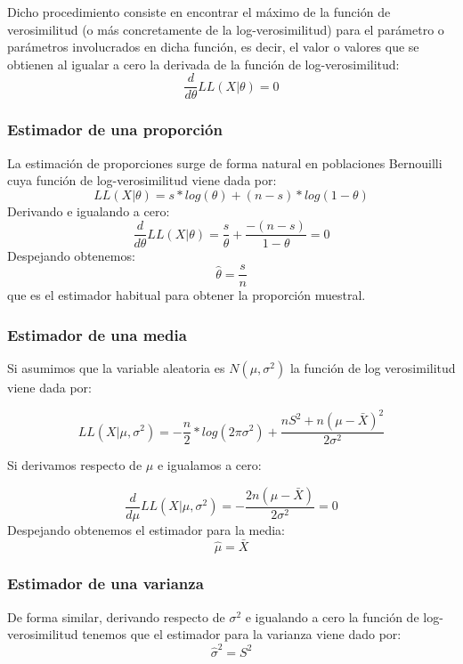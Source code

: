 \documentclass[
]{book}
\begin{document}
Dicho procedimiento consiste en encontrar el máximo de la función de verosimilitud (o más concretamente de la log-verosimilitud) para el parámetro o parámetros involucrados en dicha función, es decir, el valor o valores que se obtienen al igualar a cero la derivada de la función de log-verosimilitud: \[\frac{d}{d\theta} LL(X | \theta) = 0\]

\hypertarget{estimador-de-una-proporciuxf3n}{%
\subsubsection{Estimador de una proporción}\label{estimador-de-una-proporciuxf3n}}

La estimación de proporciones surge de forma natural en poblaciones Bernouilli cuya función de log-verosimilitud viene dada por: \[LL(X |\theta) = s*log(\theta) + (n-s)*log(1-\theta)\] Derivando e igualando a cero: \[\frac{d}{d\theta} LL(X | \theta) = \frac{s}{\theta}+\frac{-(n-s)}{1-\theta} = 0\] Despejando obtenemos: \[\hat{\theta} = \frac{s}{n}\] que es el estimador habitual para obtener la proporción muestral.

\hypertarget{estimador-de-una-media}{%
\subsubsection{Estimador de una media}\label{estimador-de-una-media}}

Si asumimos que la variable aleatoria es \(N(\mu,\sigma^2)\) la función de log verosimilitud viene dada por:

\[LL(X |\mu,\sigma^2) = -\frac{n}{2}*log(2\pi\sigma^2)+\frac{nS^2 + n(\mu-\bar{X})^2}{2\sigma^2}\]

Si derivamos respecto de \(\mu\) e igualamos a cero:

\[\frac{d}{d\mu}LL(X |\mu,\sigma^2) = -\frac{2n(\mu-\bar{X})}{2\sigma^2} = 0\] Despejando obtenemos el estimador para la media: \[\hat\mu = \bar X\]

\hypertarget{estimador-de-una-varianza}{%
\subsubsection{Estimador de una varianza}\label{estimador-de-una-varianza}}

De forma similar, derivando respecto de \(\sigma^2\) e igualando a cero la función de log-verosimilitud tenemos que el estimador para la varianza viene dado por: \[\hat \sigma^2 = S^2\]
\end{document}
